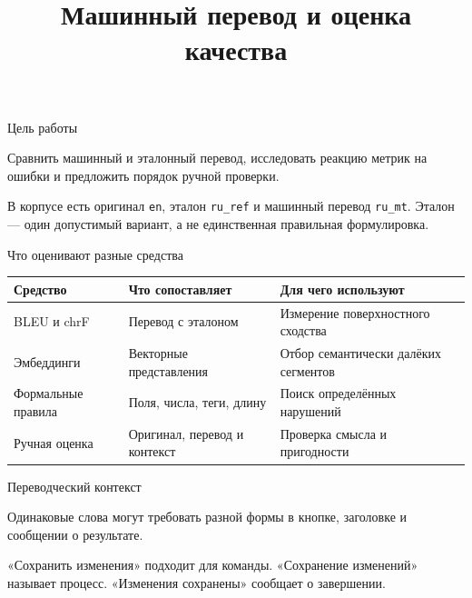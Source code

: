 \documentclass[aspectratio=169,12pt]{beamer}
\author{}\date{}
\title{Машинный перевод и оценка качества}
\begin{document}
\begin{frame}[plain]\vspace{0.6cm}{\large Лабораторная работа № 3: метрики, контекст и проверка ошибок\par}\end{frame}
\begin{frame}{Цель работы}
\color{ink}
{\small Сравнить машинный и эталонный перевод, исследовать реакцию метрик на ошибки и предложить порядок ручной проверки.
\par\vspace{0.6em}В корпусе есть оригинал \texttt{en}, эталон \texttt{ru\_ref} и машинный перевод \texttt{ru\_mt}. Эталон — один допустимый вариант, а не единственная правильная формулировка.}
\end{frame}

\begin{frame}{Что оценивают разные средства}
\color{ink}
{\small\renewcommand{\arraystretch}{1.15}\begin{tabular}{@{}Л{0.25} Л{0.32} Л{0.35}@{}}\toprule
Средство & Что сопоставляет & Для чего используют\\\midrule
BLEU и chrF & Перевод с эталоном & Измерение поверхностного сходства\\[0.15em]
Эмбеддинги & Векторные представления & Отбор семантически далёких сегментов\\[0.15em]
Формальные правила & Поля, числа, теги, длину & Поиск определённых нарушений\\[0.15em]
Ручная оценка & Оригинал, перевод и контекст & Проверка смысла и пригодности\\[0.15em]\bottomrule\end{tabular}}
\end{frame}

\begin{frame}{Переводческий контекст}
\color{ink}
{\small Одинаковые слова могут требовать разной формы в кнопке, заголовке и сообщении о результате.
\par\vspace{0.6em}«Сохранить изменения» подходит для команды. «Сохранение изменений» называет процесс. «Изменения сохранены» сообщает о завершении.}
\end{frame}
\end{document}
